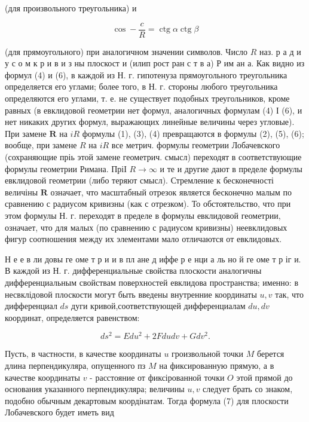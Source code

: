 \documentclass[10pt]{article}
\begin{document}
(для произвольного треугольника) и



\[

\cos -\frac{c}{R}=\operatorname{ctg} \alpha \operatorname{ctg} \beta

\]



(для прямоугольного) при аналогичном значении символов. Число $R$ наз. р а д и у с о м к р и в и з ны плоскост и (илип рост ран с т в а) Р им ан а. Как видно из формул (4) и (6), в каждой из Н. г. гипотенуза прямоугольного треугольника определяется его углами; более того, в Н. г. стороны любого треугольника определяются его углами, т. е. не существует подобных треугольников, кроме равных (в евклидовой геометрии нет формул, аналогичных формулам (4) І (6), и нет никаких других формул, выражающих линейные величины через угловые). При замене $\boldsymbol{R}$ на $i R$ формулы (1), (3), (4) превращаются в формулы (2), (5), (6); вообще, при замене $R$ на $i R$ все метрич. формулы геометрии Лобачевского (сохраняющие пріь этой замене геометрич. смысл) переходят в соответствующие формулы геометрии Римана. ПріІ $R \rightarrow \infty$ и те и другие дают в пределе формулы евклидовой геометрии (либо теряют смысл). Стремление к бесконечності величіны $\boldsymbol{R}$ означает, что масштабный отрезок является бесконечно малым по сравнению с радиусом кривизны (как с отрезком). То обстоятельство, что при этом формулы Н. г. переходят в пределе в формулы евклидовой геометрии, означает, что для малых (по сравнению с радиусом кривизны) неевклидовых фигур соотношения между их элементами мало отличаются от евклидовых.



Н е е в ли довы ге оме т р и и в пл ане д иффе р е нци а ль но й ге оме т р іг и. В каждой из Н. г. дифференциальные свойства плоскости аналогичны дифференциальным свойствам поверхностей евклидова пространства; именно: в несвклідовой плоскости могут быть введены внутренние координаты $u, v$ так, что дифференциал $d s$ дуги кривой,соответствующей дифференциалам $d u, d v$ координат, определяется равенством:



\[

d s^{2}=E d u^{2}+2 F d u d v+G d v^{2} .

\]



Пусть, в частности, в качестве координаты $u$ гроизвольной точки $M$ берется длина перпендикуляра, опущенного пз $M$ на фиксированную прямую, а в качестве координаты $v$ - расстояние от фиксірованной точки $O$ этой прямой до основания указанного перпендикуляра; величины $u, v$ следует брать со знаком, подобно обычным декартовым коордінатам. Тогда формула (7) для плоскости Лобачевского будет иметь вид
\end{document}
